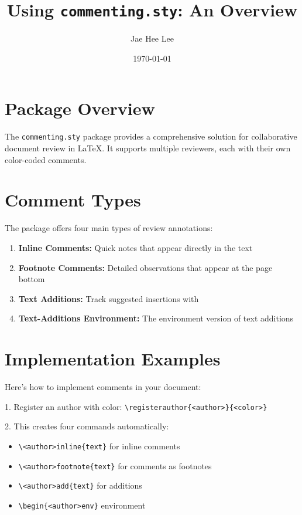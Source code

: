 \documentclass{article}
\title{Using \texttt{commenting.sty}: An Overview}
\author{Jae Hee Lee}
\date{\today}
\begin{document}
\maketitle

\section{Package Overview}
The \texttt{commenting.sty} package provides a comprehensive solution for collaborative document 
review in LaTeX. It supports multiple reviewers, each 
with their own color-coded comments.

\section{Comment Types}
The package offers four main types of review annotations:

\begin{enumerate}
    \item \textbf{Inline Comments:} Quick notes that appear directly in 
    the text
    
    \item \textbf{Footnote Comments:} Detailed observations that appear at the page 
    bottom
    
    \item \textbf{Text Additions:} Track suggested insertions with 
    
    \item \textbf{Text-Additions Environment:} The environment version of text additions
\end{enumerate}

\section{Implementation Examples}
\begin{aliceenv}
Here's how to implement comments in your document:

1. Register an author with color:
   \verb|\registerauthor{<author>}{<color>}|

2. This creates four commands automatically:
   \begin{itemize}
       \item \verb|\<author>|\verb|inline{text}| for inline comments
       \item \verb|\<author>|\verb|footnote{text}| for comments as footnotes
       \item \verb|\<author>|\verb|add{text}| for additions
       \item \verb|\begin{<author>|\verb|env}| environment
   \end{itemize}
\end{aliceenv}
\end{document}
